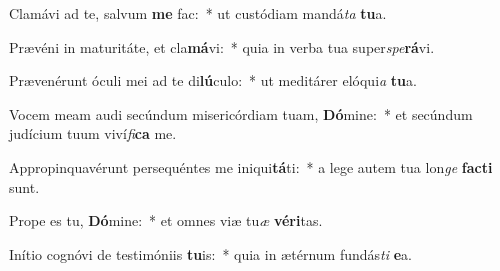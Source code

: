 \item Clamávi ad te, salvum \textbf{me} fac:~* ut custódiam mandá\textit{ta} \textbf{tu}a.
\item Prævéni in maturitáte, et cla\textbf{má}vi:~* quia in verba tua super\textit{spe}\textbf{rá}vi.
\item Prævenérunt óculi mei ad te di\textbf{lú}culo:~* ut meditárer elóqui\textit{a} \textbf{tu}a.
\item Vocem meam audi secúndum misericórdiam tuam, \textbf{Dó}mine:~* et secúndum judícium tuum viví\textit{fi}\textbf{ca} me.
\item Appropinquavérunt persequéntes me iniqui\textbf{tá}ti:~* a lege autem tua lon\textit{ge} \textbf{fac}\textbf{ti} sunt.
\item Prope es tu, \textbf{Dó}mine:~* et omnes viæ tu\textit{æ} \textbf{vé}\textbf{ri}tas.
\item Inítio cognóvi de testimóniis \textbf{tu}is:~* quia in ætérnum fundás\textit{ti} \textbf{e}a.
